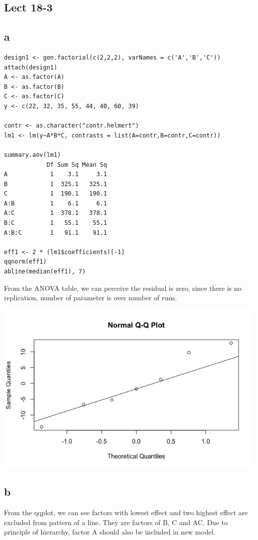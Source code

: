 \documentclass[11pt,letterpaper]{article}
\begin{document}
\subsection*{Lect 18-3}
\subsection*{a}
\begin{verbatim}
design1 <- gen.factorial(c(2,2,2), varNames = c('A','B','C'))
attach(design1)
A <- as.factor(A)
B <- as.factor(B)
C <- as.factor(C)
y <- c(22, 32, 35, 55, 44, 40, 60, 39)

contr <- as.character("contr.helmert")
lm1 <- lm(y~A*B*C, contrasts = list(A=contr,B=contr,C=contr))

summary.aov(lm1)
            Df Sum Sq Mean Sq
A            1    3.1     3.1
B            1  325.1   325.1
C            1  190.1   190.1
A:B          1    6.1     6.1
A:C          1  378.1   378.1
B:C          1   55.1    55.1
A:B:C        1   91.1    91.1

eff1 <- 2 * (lm1$coefficients)[-1]
qqnorm(eff1)
abline(median(eff1), 7)
\end{verbatim}

\noindent From the ANOVA table, we can perceive the residual is zero, since there is no replication, number of parameter is over number of runs. 

\includegraphics[scale=0.55]{lect18-3-a.png}

\subsection*{b}
\noindent From the qqplot, we can see factors with lowest effect and two highest effect are excluded from pattern of a line. They are factors of B, C and AC. Due to principle of hierarchy, factor A should also be included in new model. 
\end{document}
